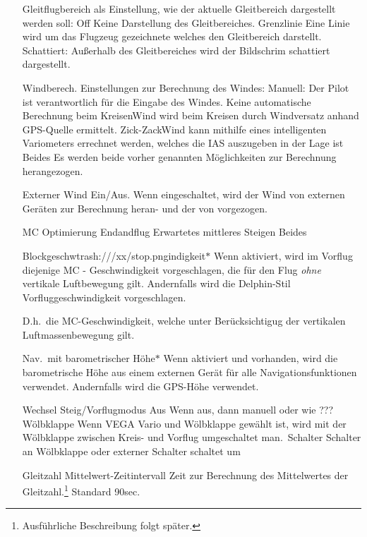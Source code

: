 \begin{enumerate}
\item[Gleitflugbereich als] Einstellung, wie der aktuelle Gleitbereich dargestellt werden soll: \textsf{Off} Keine Darstellung des Gleitbereiches. \textsf{Grenzlinie} Eine Linie wird um das Flugzeug gezeichnete welches den Gleitbereich darstellt. \textsf{Schattiert}: Außerhalb des Gleitbereiches wird der Bildschrim schattiert dargestellt.
\item[Windberech.]Einstellungen zur Berechnung des Windes: \textsf{ Manuell}: Der Pilot ist verantwortlich für die Eingabe des Windes. Keine automatische Berechnung \textsf{ beim Kreisen}Wind wird beim Kreisen durch Windversatz anhand GPS-Quelle ermittelt. \textsf{Zick-Zack}Wind kann  mithilfe eines intelligenten Variometers  errechnet werden, welches die IAS auszugeben in der Lage ist \textsf{Beides} Es werden beide vorher genannten Möglichkeiten zur Berechnung herangezogen.
\item[Externer Wind] Ein/Aus. Wenn eingeschaltet, wird der Wind von externen Geräten zur Berechnung heran- und der von \xc vorgezogen.
\item[MC Optimierung]\textsf{Endandflug} \textsf{Erwartetes mittleres Steigen} \textsf{Beides}
\item[Blockgeschwtrash:///xx/stop.pngindigkeit$\ast$] Wenn aktiviert, wird im
Vorflug diejenige \textsf{MC} - Geschwindigkeit vorgeschlagen,  die für den Flug \textsl{ohne} vertikale Luftbewegung gilt. Andernfalls wird die \textsf{Delphin-Stil} Vorfluggeschwindigkeit vorgeschlagen.

    D.h.\ die \textsf{MC}-Geschwindigkeit, welche unter Berücksichtigug der vertikalen Luftmassenbewegung gilt.
\item[Nav.\ mit barometrischer Höhe$\ast$] Wenn aktiviert und vorhanden, wird die barometrische Höhe aus einem externen Gerät für alle Navigationsfunktionen verwendet.  Andernfalls wird die \textsf{GPS}-Höhe verwendet.
\item[Wechsel Steig/Vorflugmodus] \textsf{Aus} Wenn aus, dann manuell oder wie ???  \textsf{Wölbklappe} Wenn VEGA Vario und Wölbklappe gewählt ist, wird mit der Wölbklappe zwischen Kreis- und Vorflug umgeschaltet  \textsf{ man.\ Schalter} Schalter an Wölbklappe oder externer Schalter schaltet um\stop
\item[Gleitzahl Mittelwert-Zeitintervall]Zeit zur Berechnung des Mittelwertes der Gleitzahl.\footnote{Ausführliche  Beschreibung folgt später.} Standard 90sec.\
\end{enumerate}

